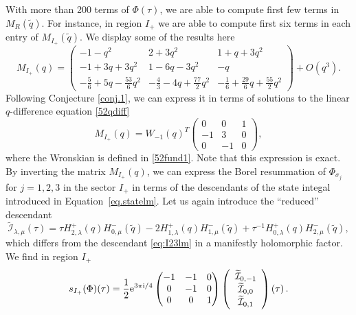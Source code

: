 \documentclass[12pt,reqno]{amsart}
\theoremstyle{definition}
\def\tq{\tilde{q}}
\def\ri{\mathrm{i}}
\def\wt{\widetilde}
\def\re{{\rm e}}
\def\ri{{\rm i}}
\def\mc{\mathcal}
\def\cO{O}
\begin{document}
With more than 200 terms of $\Phi(\tau)$, we are able to compute first
few terms in $M_R(\tq)$.  For instance, in region $I_+$ we are able to
compute first six terms in each entry of $M_{I_+}(\tq)$.  We display
some of the results here
\begin{equation}
  M_{I_+}(q) =
  \begin{pmatrix}
    -1 - q^2  &  2 + 3 q^2 & 1 + q + 3 q^2 \\
    -1 + 3q + 3q^2 & 1 - 6q - 3 q^2 &-q \\
    -\frac{5}{6} + 5 q -\frac{53}{6}q^2& -\frac{4}{3} - 4q +
    \frac{77}{2}q^2 &-\frac{1}{6} + \frac{29}{6}q
    +\frac{55}{2}q^2
  \end{pmatrix} +\cO(q^3).
\end{equation}
Following Conjecture \ref{conj.1}, we can express it in terms of
solutions to the linear $q$-difference equation
\eqref{52qdiff}
\begin{equation}
  M_{I_+}(q) = W_{-1}(q)^T
  \begin{pmatrix}
    0&0&1\\
    -1&3&0\\
    0&-1&0
  \end{pmatrix},
\end{equation}
where the Wronskian is defined in \eqref{52fund1}. Note that this
expression is exact. By inverting the matrix $M_{I_+}(q)$, we can
express the Borel resummation of $\Phi_{\sigma_{j}}$ for $j=1,2,3$ in
the sector $I_+$ in terms of the descendants of the state integal
introduced in Equation~\eqref{eq.statelm}.  Let us again introduce the
``reduced'' descendant
\begin{equation}
  \wt{\mc{I}}_{\lambda,\mu}(\tau) =
  \tau H_{2,\lambda}^{+}(q)H_{0,\mu}^{-}(\tq)
  -2 H_{1,\lambda}^{+}(q)H_{1,\mu}^{-}(\tq)
  +\tau^{-1} H_{0,\lambda}^{+}(q)H_{2,\mu}^{-}(\tq),
\end{equation}
which differs from the descendant \eqref{eq:I23lm} in a manifestly
holomorphic factor. We find in region $I_+$
\begin{equation}
  s_{I_+}(\Phi)(\tau)
  =
  \frac{1}{2}\re^{3\pi\ri/4}
    \begin{pmatrix}
      -1 & -1 & 0 \\ 0 & -1 & 0\\0 & 0 & 1
    \end{pmatrix}
     \left(
      \begin{array}{c}
        \wt{\mc{I}}_{0,-1}\\
        \wt{\mc{I}}_{0,0}\\
        \wt{\mc{I}}_{0,1}\\
      \end{array}\right)(\tau)\,.
\end{equation}
\end{document}
